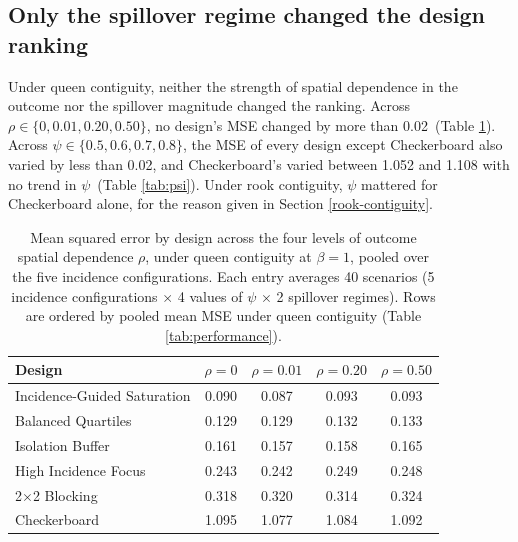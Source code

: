 \documentclass[11pt]{article}
\begin{document}
\subsection{Only the spillover regime changed the design ranking}\label{sensitivity-to-spatial-dependence-spillover-magnitude-and-spillover-regime}


Under queen contiguity, neither the strength of spatial dependence in
the outcome nor the spillover magnitude changed the ranking. Across
\(\rho \in \{0, 0.01, 0.20, 0.50\}\), no design's MSE changed by more
than 0.02\iffullsi\ (Table \ref{tab:rho})\fi. Across
\(\psi \in \{0.5, 0.6, 0.7, 0.8\}\), the MSE of every design except
Checkerboard also varied by less than 0.02, and Checkerboard's varied
between 1.052 and 1.108 with no trend in \(\psi\)\iffullsi\ (Table
\ref{tab:psi})\fi. Under rook contiguity, \(\psi\) mattered for
Checkerboard alone, for the reason given in Section \ref{rook-contiguity}.

\iffullsi
\begin{table}[!htb]

\small
\centering

\caption{Mean squared error by design across the four levels of outcome spatial dependence $\rho$, under queen contiguity at $\beta = 1$, pooled over the five incidence configurations. Each entry averages 40 scenarios (5 incidence configurations $\times$ 4 values of $\psi$ $\times$ 2 spillover regimes). Rows are ordered by pooled mean MSE under queen contiguity (Table \ref{tab:performance}).}
\label{tab:rho}

\begin{tabular}{lcccc}

\toprule
Design & $\rho=0$ & $\rho=0.01$ & $\rho=0.20$ & $\rho=0.50$ \\

\midrule
Incidence-Guided Saturation & 0.090 & 0.087 & 0.093 & 0.093 \\
Balanced Quartiles & 0.129 & 0.129 & 0.132 & 0.133 \\
Isolation Buffer & 0.161 & 0.157 & 0.158 & 0.165 \\
High Incidence Focus & 0.243 & 0.242 & 0.249 & 0.248 \\
2$\times$2 Blocking & 0.318 & 0.320 & 0.314 & 0.324 \\
Checkerboard & 1.095 & 1.077 & 1.084 & 1.092 \\

\bottomrule

\end{tabular}

\end{table}
\fi
\end{document}
